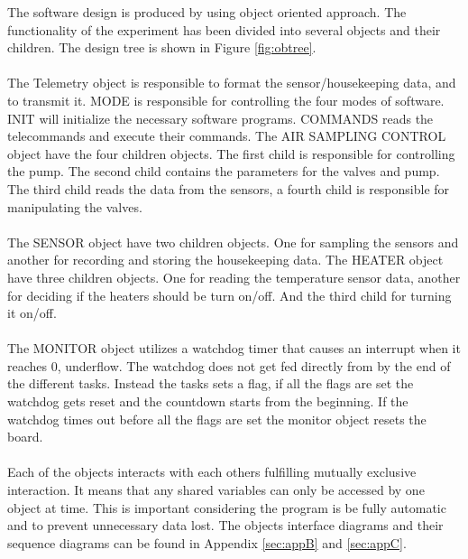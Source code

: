 \begin{enumerate}[label=(\alph*)]
The software design is produced by using object oriented approach. The functionality of the experiment has been divided into several objects and their children. The design tree is shown in Figure \ref{fig:obtree}.\\
\\
The Telemetry object is responsible to format the sensor/housekeeping data, and to transmit it. MODE is responsible for controlling the four modes of software. INIT will initialize the necessary software programs. COMMANDS reads the telecommands and execute their commands. The AIR SAMPLING CONTROL object have the four children objects. The first child is responsible for controlling the pump. The second child contains the parameters for the valves and pump. The third child reads the data from the sensors, a fourth child is responsible for manipulating the valves.\\
\\
The SENSOR object have two children objects. One for sampling the sensors and another for recording and storing the housekeeping data. The HEATER object have three children objects. One for reading the temperature sensor data, another for deciding if the heaters should be turn on/off. And the third child for turning it on/off.\\ 
\\
The MONITOR object utilizes a watchdog timer that causes an interrupt when it reaches 0, underflow. The watchdog does not get fed directly from by the end of the different tasks. Instead the tasks sets a flag, if all the flags are set the watchdog gets reset and the countdown starts from the beginning. If the watchdog times out before all the flags are set the monitor object resets the board.\\
\\
Each of the objects interacts with each others fulfilling mutually exclusive interaction. It means that any shared variables can only be accessed by one object at time. This is important considering the program is be fully automatic and to prevent unnecessary data lost. The objects interface diagrams and their sequence diagrams can be found in Appendix \ref{sec:appB} and \ref{sec:appC}.
\end{enumerate}
